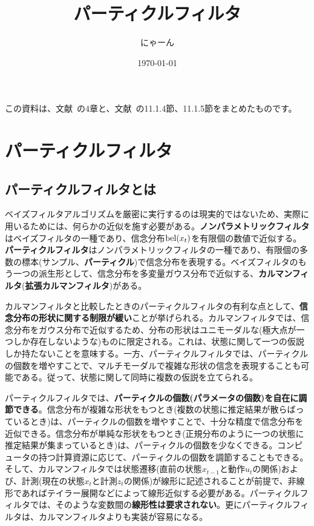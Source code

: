 \documentclass[dvipdfmx,a4paper]{jsarticle}
\title{パーティクルフィルタ}
\author{にゃーん}
\date{\today}
\begin{document}
\maketitle

この資料は、文献~\cite{Thrun07}の4章と、文献~\cite{Bishop06}の11.1.4節、11.1.5節をまとめたものです。

\section{パーティクルフィルタ}
\subsection{パーティクルフィルタとは}
ベイズフィルタアルゴリズムを厳密に実行するのは現実的ではないため、実際に用いるためには、何らかの近似を施す必要がある。\textbf{ノンパラメトリックフィルタ}はベイズフィルタの一種であり、信念分布$\operatorname{bel}(x_t)$を有限個の数値で近似する。\textbf{パーティクルフィルタ}はノンパラメトリックフィルタの一種であり、有限個の多数の標本(サンプル、\textbf{パーティクル})で信念分布を表現する。ベイズフィルタのもう一つの派生形として、信念分布を多変量ガウス分布で近似する、\textbf{カルマンフィルタ}(\textbf{拡張カルマンフィルタ})がある。\newline

カルマンフィルタと比較したときのパーティクルフィルタの有利な点として、\textbf{信念分布の形状に関する制限が緩い}ことが挙げられる。カルマンフィルタでは、信念分布をガウス分布で近似するため、分布の形状はユニモーダルな(極大点が一つしか存在しないような)ものに限定される。これは、状態に関して一つの仮説しか持たないことを意味する。一方、パーティクルフィルタでは、パーティクルの個数を増やすことで、マルチモーダルで複雑な形状の信念を表現することも可能である。従って、状態に関して同時に複数の仮説を立てられる。\newline

パーティクルフィルタでは、\textbf{パーティクルの個数(パラメータの個数)を自在に調節できる}。信念分布が複雑な形状をもつとき(複数の状態に推定結果が散らばっているとき)は、パーティクルの個数を増やすことで、十分な精度で信念分布を近似できる。信念分布が単純な形状をもつとき(正規分布のように一つの状態に推定結果が集まっているとき)は、パーティクルの個数を少なくできる。コンピュータの持つ計算資源に応じて、パーティクルの個数を調節することもできる。そして、カルマンフィルタでは状態遷移(直前の状態$x_{t - 1}$と動作$u_t$の関係)および、計測(現在の状態$x_t$と計測$z_t$の関係)が線形に記述されることが前提で、非線形であればテイラー展開などによって線形近似する必要がある。パーティクルフィルタでは、そのような変数間の\textbf{線形性は要求されない}。更にパーティクルフィルタは、カルマンフィルタよりも実装が容易になる。
\end{document}
